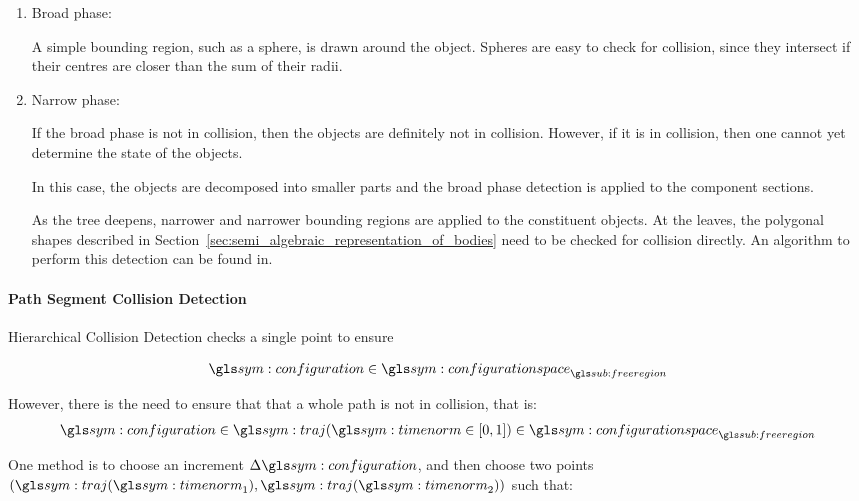 				\begin{enumerate}

					\item Broad phase:

						A simple bounding region, such as a sphere, is drawn
						around the object. Spheres are easy to check for
						collision, since they intersect if their centres are
						closer than the sum of their radii.

					\item Narrow phase:

						If the broad phase is not in collision, then the objects
						are definitely not in collision. However, if it is in
						collision, then one cannot yet determine the state of
						the objects.

						In this case, the objects are decomposed into smaller
						parts and the broad phase detection is applied to the
						component sections.

						As the tree deepens, narrower and narrower bounding
						regions are applied to the constituent objects. At the
						leaves, the polygonal shapes described in
						Section~\ref{sec:semi_algebraic_representation_of_bodies}
						need to be checked for collision directly. An algorithm
						to perform this detection can be found in.

				\end{enumerate}

			\paragraph{Path Segment Collision Detection}%
			\label{sec:path_segment_collision_detection}

				Hierarchical Collision Detection checks a single point to ensure

				\begin{equation}
					\configuration \in \configurationspace_{\freeregion}
				\end{equation}

				However, there is the need to ensure that that a whole path is
				not in collision, that is:
				\begin{equation}
					\configuration \in
						\traj(\timenorm \in [0, 1])
							\in \configurationspace_{\freeregion}
				\end{equation}

				One method is to choose an increment $\Delta\configuration$, and
				then choose two points $(\traj(\timenorm_1),
				\traj(\timenorm_2))$ such that:

